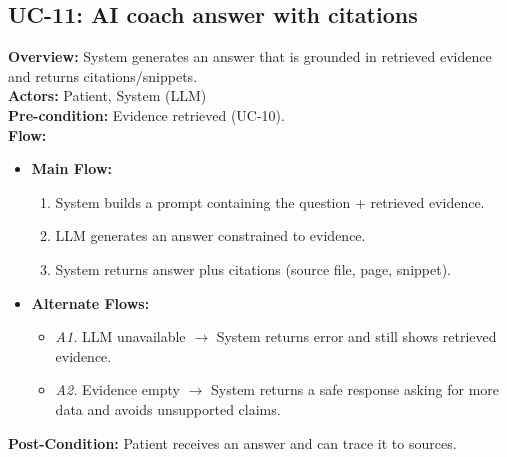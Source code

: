 \documentclass[12pt, a4paper]{article}
\begin{document}
\subsection*{UC-11: AI coach answer with citations}
\textbf{Overview:} System generates an answer that is grounded in retrieved evidence and returns citations/snippets. \\
\textbf{Actors:} Patient, System (LLM) \\
\textbf{Pre-condition:} Evidence retrieved (UC-10). \\
\textbf{Flow:}
\begin{itemize}[leftmargin=*]
    \item \textbf{Main Flow:}
    \begin{enumerate}
        \item System builds a prompt containing the question + retrieved evidence.
        \item LLM generates an answer constrained to evidence.
        \item System returns answer plus citations (source file, page, snippet).
    \end{enumerate}
    \item \textbf{Alternate Flows:}
    \begin{itemize}
        \item \textit{A1.} LLM unavailable $\rightarrow$ System returns error and still shows retrieved evidence.
        \item \textit{A2.} Evidence empty $\rightarrow$ System returns a safe response asking for more data and avoids unsupported claims.
    \end{itemize}
\end{itemize}
\textbf{Post-Condition:} Patient receives an answer and can trace it to sources.
\end{document}
